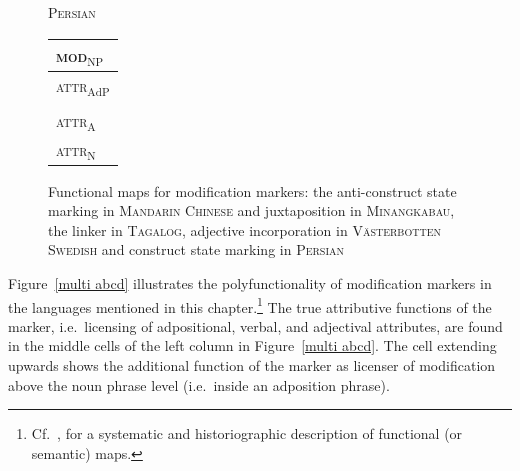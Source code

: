 \begin{figure}
{\begin{center}
\end{center}
}
\parbox[b]{0.20\textwidth}{
\begin{center}\textsc{Persian}\\
\bigskip
\begin{tabular}{| l |}
\hline
\textsc{mod}$_{\text{NP}}$\\
\hline
\hline
\textsc{attr}$_{\text{AdP}}$\\
\hline
\\
\hline
\textsc{attr}$_{\text{A}}$\\
\hline
\textsc{attr}$_{\text{N}}$\\
\hline
\end{tabular}
\end{center}
}
\caption[Functional map for modification marking]{Functional maps for modification markers: the anti\hyp{}construct state marking in \textsc{Mandarin Chinese} and juxtaposition in \textsc{Minangkabau}, the linker in \textsc{Tagalog}, adjective incorporation in \textsc{Västerbotten Swedish} and construct state marking in \textsc{Persian}
}
\end{figure}
Figure~\ref{multi abcd} illustrates the polyfunctionality of modification markers in the languages mentioned in this chapter.\footnote{Cf.~\cite{haspelmath2003}, for a systematic and historiographic description of functional (or semantic) maps.} The true attributive functions of the marker, i.e.~licensing of adpositional, verbal, and adjectival attributes, are found in the middle cells of the left column in Figure~\ref{multi abcd}. The cell extending upwards shows the additional function of the marker as licenser of modification above the noun phrase level (i.e.~inside an adposition phrase).%

